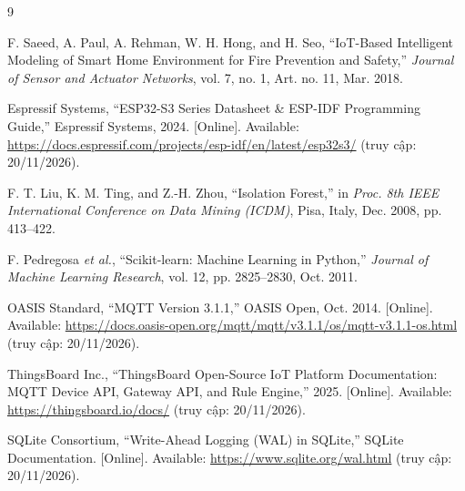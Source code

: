 
{}

\begin{thebibliography}{9}

F. Saeed, A. Paul, A. Rehman, W. H. Hong, and H. Seo, ``IoT-Based Intelligent Modeling of Smart Home Environment for Fire Prevention and Safety,'' \textit{Journal of Sensor and Actuator Networks}, vol. 7, no. 1, Art. no. 11, Mar. 2018.

Espressif Systems, ``ESP32-S3 Series Datasheet \& ESP-IDF Programming Guide,'' Espressif Systems, 2024. [Online]. Available: \url{https://docs.espressif.com/projects/esp-idf/en/latest/esp32s3/} (truy cập: 20/11/2026).

F. T. Liu, K. M. Ting, and Z.-H. Zhou, ``Isolation Forest,'' in \textit{Proc. 8th IEEE International Conference on Data Mining (ICDM)}, Pisa, Italy, Dec. 2008, pp. 413--422.

F. Pedregosa \textit{et al.}, ``Scikit-learn: Machine Learning in Python,'' \textit{Journal of Machine Learning Research}, vol. 12, pp. 2825--2830, Oct. 2011.

OASIS Standard, ``MQTT Version 3.1.1,'' OASIS Open, Oct. 2014. [Online]. Available: \url{https://docs.oasis-open.org/mqtt/mqtt/v3.1.1/os/mqtt-v3.1.1-os.html} (truy cập: 20/11/2026).

ThingsBoard Inc., ``ThingsBoard Open-Source IoT Platform Documentation: MQTT Device API, Gateway API, and Rule Engine,'' 2025. [Online]. Available: \url{https://thingsboard.io/docs/} (truy cập: 20/11/2026).

SQLite Consortium, ``Write-Ahead Logging (WAL) in SQLite,'' SQLite Documentation. [Online]. Available: \url{https://www.sqlite.org/wal.html} (truy cập: 20/11/2026).

\end{thebibliography}

